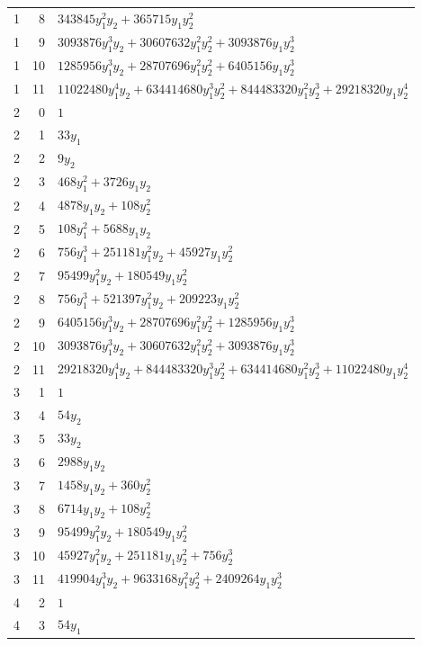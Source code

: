 \documentclass[10pt,a4paper]{article}
\begin{document}
{\begin{longtable}{rrp{125mm}}
1 & 8 & $343845 y_{1}^{2} y_{2} + 365715 y_{1} y_{2}^{2}$\\
1 & 9 & $3093876 y_{1}^{3} y_{2} + 30607632 y_{1}^{2} y_{2}^{2} + 3093876 y_{1} y_{2}^{3}$\\
1 & 10 & $1285956 y_{1}^{3} y_{2} + 28707696 y_{1}^{2} y_{2}^{2} + 6405156 y_{1} y_{2}^{3}$\\
1 & 11 & $11022480 y_{1}^{4} y_{2} + 634414680 y_{1}^{3} y_{2}^{2} + 844483320 y_{1}^{2} y_{2}^{3} + 29218320 y_{1} y_{2}^{4}$\\
2 & 0 & $1$\\
2 & 1 & $33 y_{1}$\\
2 & 2 & $9 y_{2}$\\
2 & 3 & $468 y_{1}^{2} + 3726 y_{1} y_{2}$\\
2 & 4 & $4878 y_{1} y_{2} + 108 y_{2}^{2}$\\
2 & 5 & $108 y_{1}^{2} + 5688 y_{1} y_{2}$\\
2 & 6 & $756 y_{1}^{3} + 251181 y_{1}^{2} y_{2} + 45927 y_{1} y_{2}^{2}$\\
2 & 7 & $95499 y_{1}^{2} y_{2} + 180549 y_{1} y_{2}^{2}$\\
2 & 8 & $756 y_{1}^{3} + 521397 y_{1}^{2} y_{2} + 209223 y_{1} y_{2}^{2}$\\
2 & 9 & $6405156 y_{1}^{3} y_{2} + 28707696 y_{1}^{2} y_{2}^{2} + 1285956 y_{1} y_{2}^{3}$\\
2 & 10 & $3093876 y_{1}^{3} y_{2} + 30607632 y_{1}^{2} y_{2}^{2} + 3093876 y_{1} y_{2}^{3}$\\
2 & 11 & $29218320 y_{1}^{4} y_{2} + 844483320 y_{1}^{3} y_{2}^{2} + 634414680 y_{1}^{2} y_{2}^{3} + 11022480 y_{1} y_{2}^{4}$\\
3 & 1 & $1$\\
3 & 4 & $54 y_{2}$\\
3 & 5 & $33 y_{2}$\\
3 & 6 & $2988 y_{1} y_{2}$\\
3 & 7 & $1458 y_{1} y_{2} + 360 y_{2}^{2}$\\
3 & 8 & $6714 y_{1} y_{2} + 108 y_{2}^{2}$\\
3 & 9 & $95499 y_{1}^{2} y_{2} + 180549 y_{1} y_{2}^{2}$\\
3 & 10 & $45927 y_{1}^{2} y_{2} + 251181 y_{1} y_{2}^{2} + 756 y_{2}^{3}$\\
3 & 11 & $419904 y_{1}^{3} y_{2} + 9633168 y_{1}^{2} y_{2}^{2} + 2409264 y_{1} y_{2}^{3}$\\
4 & 2 & $1$\\
4 & 3 & $54 y_{1}$\\

\end{longtable}}
\end{document}
